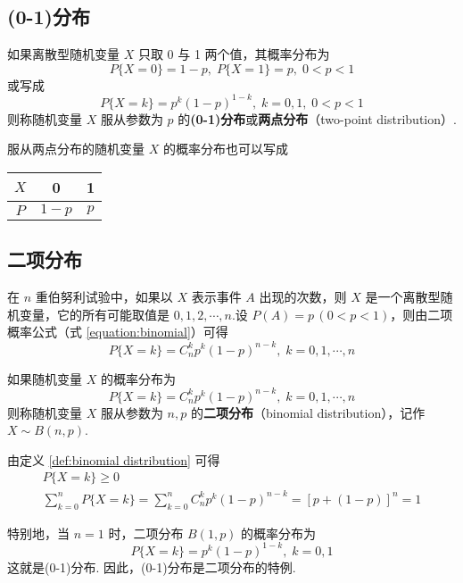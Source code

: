 \subsection{(0-1)分布}

\begin{definition}
    如果离散型随机变量 $X$ 只取 0 与 1 两个值，其概率分布为
    $$
    P\{X=0\}=1-p, \; P\{X=1\}=p, \; 0<p<1
    $$
    或写成
    $$
    P\{X=k\}=p^k (1-p)^{1-k}, \; k=0,1, \; 0<p<1
    $$
    则称随机变量 $X$ 服从参数为 $p$ 的\textbf{(0-1)分布}或\textbf{两点分布}（two-point distribution）.
\end{definition}

服从两点分布的随机变量 $X$ 的概率分布也可以写成
\begin{table*}[htbp]
    \centering

    \begin{tabular}{c | c c}
        \hline
        $X$ & 0 & 1 \\
        \hline
        $P$ & $1-p$ & $p$ \\
        \hline
    \end{tabular}
\end{table*}

\subsection{二项分布}

在 $n$ 重伯努利试验中，如果以 $X$ 表示事件 $A$ 出现的次数，则 $X$ 是一个离散型随机变量，它的所有可能取值是 $0,1,2,\cdots,n$.设 $P(A)=p\,(0<p<1)$，则由二项概率公式（式 \eqref{equation:binomial}）可得
$$
P\{X=k\}=C_n^k p^k (1-p)^{n-k}, \; k=0,1,\cdots,n
$$

\begin{definition} \label{def:binomial distribution}
    如果随机变量 $X$ 的概率分布为
    $$
    P\{X=k\}=C_n^k p^k (1-p)^{n-k}, \; k=0,1,\cdots,n
    $$
    则称随机变量 $X$ 服从参数为 $n,p$ 的\textbf{二项分布}（binomial distribution），记作 $X \sim B(n,p)$.
\end{definition}

由定义 \ref{def:binomial distribution} 可得
\begin{gather*}
    P\{X=k\} \geqslant 0\\
    \sum_{k=0}^n P\{X=k\} = \sum_{k=0}^n C_n^k p^k (1-p)^{n-k} = [p+(1-p)]^n=1
\end{gather*}

特别地，当 $n=1$ 时，二项分布 $B(1,p)$ 的概率分布为
$$
P\{X=k\} = p^k (1-p)^{1-k}, \; k=0,1
$$
这就是(0-1)分布. 因此，(0-1)分布是二项分布的特例.

